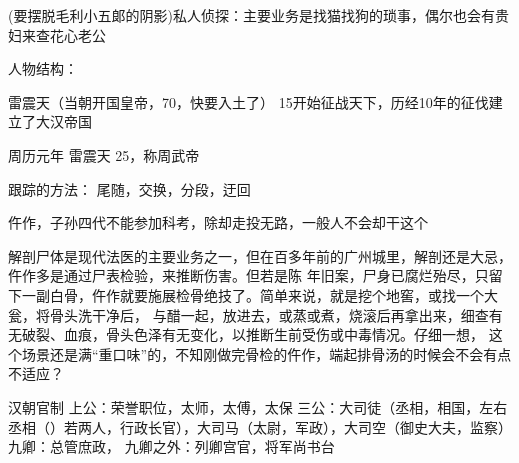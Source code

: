 (要摆脱毛利小五郞的阴影)私人侦探：主要业务是找猫找狗的琐事，偶尔也会有贵妇来查花心老公


人物结构：

雷震天（当朝开国皇帝，70，快要入土了）
15开始征战天下，历经10年的征伐建立了大汉帝国

周历元年
雷震天 25，称周武帝







跟踪的方法：
尾随，交换，分段，迂回

       
仵作，子孙四代不能参加科考，除却走投无路，一般人不会却干这个

解剖尸体是现代法医的主要业务之一，但在百多年前的广州城里，解剖还是大忌，仵作多是通过尸表检验，来推断伤害。但若是陈
年旧案，尸身已腐烂殆尽，只留下一副白骨，仵作就要施展检骨绝技了。简单来说，就是挖个地窖，或找一个大瓮，将骨头洗干净后，
与醋一起，放进去，或蒸或煮，烧滚后再拿出来，细查有无破裂、血痕，骨头色泽有无变化，以推断生前受伤或中毒情况。仔细一想，
这个场景还是满“重口味”的，不知刚做完骨检的仵作，端起排骨汤的时候会不会有点不适应？


汉朝官制
上公：荣誉职位，太师，太傅，太保
三公：大司徒（丞相，相国，左右丞相（）若两人，行政长官），大司马（太尉，军政），大司空（御史大夫，监察）
九卿：总管庶政，
九卿之外：列卿宫官，将军尚书台